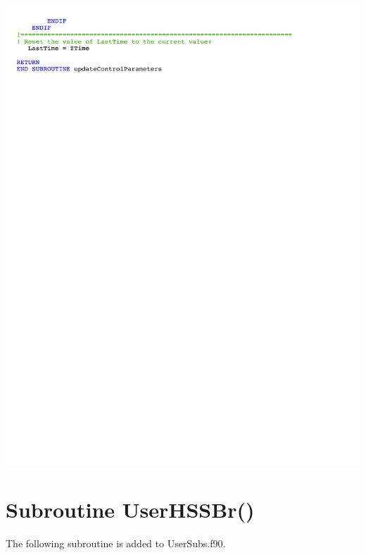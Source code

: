 \noindent
\includegraphics[width=\linewidth]{Figures/AppendixDFigures/figD-3C.pdf}

\section{Subroutine UserHSSBr()} \label{sectionD-4}
The following subroutine is added to UserSubs.f90.

